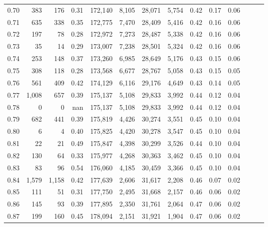 \begin{tabular}{rrrrrrrrrrrrrr}
0.70 &     383 &    176 &  0.31 &  172,140 &    8,105 &  28,071 &   5,754 &  0.42 &  0.17 &      0.06 \\
0.71 &     635 &    338 &  0.35 &  172,775 &    7,470 &  28,409 &   5,416 &  0.42 &  0.16 &      0.06 \\
0.72 &     197 &     78 &  0.28 &  172,972 &    7,273 &  28,487 &   5,338 &  0.42 &  0.16 &      0.06 \\
0.73 &      35 &     14 &  0.29 &  173,007 &    7,238 &  28,501 &   5,324 &  0.42 &  0.16 &      0.06 \\
0.74 &     253 &    148 &  0.37 &  173,260 &    6,985 &  28,649 &   5,176 &  0.43 &  0.15 &      0.06 \\
0.75 &     308 &    118 &  0.28 &  173,568 &    6,677 &  28,767 &   5,058 &  0.43 &  0.15 &      0.05 \\
0.76 &     561 &    409 &  0.42 &  174,129 &    6,116 &  29,176 &   4,649 &  0.43 &  0.14 &      0.05 \\
0.77 &   1,008 &    657 &  0.39 &  175,137 &    5,108 &  29,833 &   3,992 &  0.44 &  0.12 &      0.04 \\
0.78 &       0 &      0 &   nan &  175,137 &    5,108 &  29,833 &   3,992 &  0.44 &  0.12 &      0.04 \\
0.79 &     682 &    441 &  0.39 &  175,819 &    4,426 &  30,274 &   3,551 &  0.45 &  0.10 &      0.04 \\
0.80 &       6 &      4 &  0.40 &  175,825 &    4,420 &  30,278 &   3,547 &  0.45 &  0.10 &      0.04 \\
0.81 &      22 &     21 &  0.49 &  175,847 &    4,398 &  30,299 &   3,526 &  0.44 &  0.10 &      0.04 \\
0.82 &     130 &     64 &  0.33 &  175,977 &    4,268 &  30,363 &   3,462 &  0.45 &  0.10 &      0.04 \\
0.83 &      83 &     96 &  0.54 &  176,060 &    4,185 &  30,459 &   3,366 &  0.45 &  0.10 &      0.04 \\
0.84 &   1,579 &  1,158 &  0.42 &  177,639 &    2,606 &  31,617 &   2,208 &  0.46 &  0.07 &      0.02 \\
0.85 &     111 &     51 &  0.31 &  177,750 &    2,495 &  31,668 &   2,157 &  0.46 &  0.06 &      0.02 \\
0.86 &     145 &     93 &  0.39 &  177,895 &    2,350 &  31,761 &   2,064 &  0.47 &  0.06 &      0.02 \\
0.87 &     199 &    160 &  0.45 &  178,094 &    2,151 &  31,921 &   1,904 &  0.47 &  0.06 &      0.02 \\

\end{tabular}
